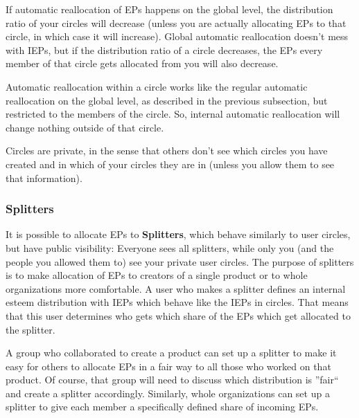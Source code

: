 \documentclass[a4paper,12pt]{scrartcl}
\begin{document}
If automatic reallocation of EPs happens on the global level, the distribution ratio of your circles will decrease (unless you are actually allocating EPs to that circle, in which case it will increase). Global automatic reallocation doesn't mess with IEPs, but if the distribution ratio of a circle decreases, the EPs every member of that circle gets allocated from you will also decrease.

Automatic reallocation within a circle works like the regular automatic reallocation on the global level, as described in the previous subsection, but restricted to the members of the circle. So, internal automatic reallocation will change nothing outside of that circle.

Circles are private, in the sense that others don't see which circles you have created and in which of your circles they are in (unless you allow them to see that information).

\subsubsection{Splitters}
It is possible to allocate EPs to \textbf{Splitters}, which behave similarly to user circles, but have public visibility: Everyone sees all splitters, while only you (and the people you allowed them to) see your private user circles. The purpose of splitters is to make allocation of EPs to creators of a single product or to whole organizations more comfortable. A user who makes a splitter defines an internal esteem distribution with IEPs which behave like the IEPs in circles. That means that this user determines who gets which share of the EPs which get allocated to the splitter.

A group who collaborated to create a product can set up a splitter to make it easy for others to allocate EPs in a fair way to all those who worked on that product. Of course, that group will need to discuss which distribution is ''fair`` and create a splitter accordingly. Similarly, whole organizations can set up a splitter to give each member a specifically defined share of incoming EPs.
\end{document}
